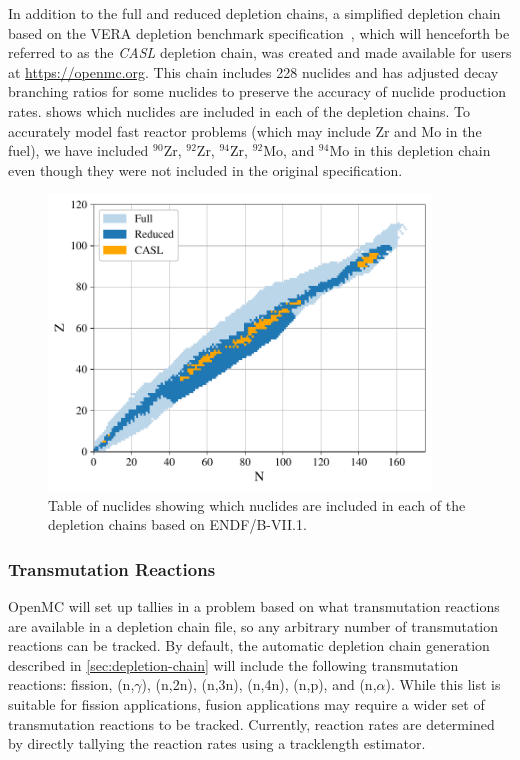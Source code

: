 \documentclass[3p,authoryear]{elsarticle}
\begin{document}
In addition to the full and reduced depletion chains, a simplified depletion
chain based on the VERA depletion benchmark specification~\citep{kim2015casl},
which will henceforth be referred to as the \emph{CASL} depletion chain, was
created and made available for users at \url{https://openmc.org}. This chain
includes 228 nuclides and has adjusted decay branching ratios for some nuclides
to preserve the accuracy of nuclide production rates.  shows
which nuclides are included in each of the depletion chains. To accurately model
fast reactor problems (which may include Zr and Mo in the fuel), we have
included $^{90}$Zr, $^{92}$Zr, $^{94}$Zr, $^{92}$Mo, and $^{94}$Mo in this
depletion chain even though they were not included in the original
specification.
\begin{figure}
  \centering
  \includegraphics[width=4in]{figures/chains.pdf}
  \caption{Table of nuclides showing which nuclides are included in each of the
    depletion chains based on ENDF/B-VII.1.}
  \label{fig:chains}
\end{figure}

\subsubsection{Transmutation Reactions}

OpenMC will set up tallies in a problem based on what transmutation reactions
are available in a depletion chain file, so any arbitrary number of
transmutation reactions can be tracked. By default, the automatic depletion
chain generation described in \cref{sec:depletion-chain} will include the
following transmutation reactions: fission, (n,$\gamma$), (n,2n), (n,3n),
(n,4n), (n,p), and (n,$\alpha$). While this list is suitable for fission
applications, fusion applications may require a wider set of transmutation
reactions to be tracked. Currently, reaction rates are determined by directly
tallying the reaction rates using a tracklength estimator.
\end{document}
